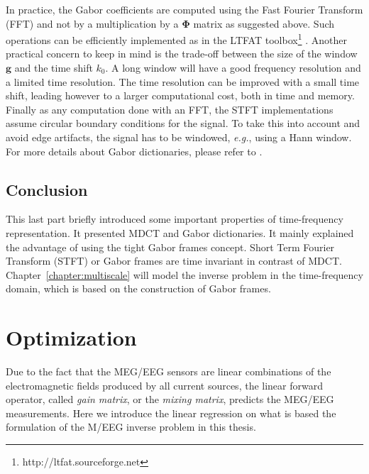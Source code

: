In practice, the Gabor coefficients are computed using the Fast Fourier Transform (FFT) and not by a multiplication by a $\mathbf{\Phi}$ matrix as suggested above. Such operations can be efficiently implemented as in the LTFAT toolbox\footnote{http://ltfat.sourceforge.net} \cite{sondergaard2012linear}. Another practical concern to keep in mind is the trade-off between the size of the window $\mathbf{g}$ and the time shift $k_0$. A long window will have a good frequency resolution and a limited time resolution. The time resolution can be improved with a small time shift, leading however to a larger computational cost, both in time and memory. Finally as any computation done with an FFT, the STFT implementations assume circular boundary conditions for the signal. To take this into account and avoid edge artifacts, the signal has to be windowed, \textit{e.g.}, using a Hann window.\\

For more details about Gabor dictionaries, please refer to \cite{daubechies1992ten}.

\subsection{Conclusion}

This last part briefly introduced some important properties of time-frequency representation. It presented MDCT and Gabor dictionaries. It mainly explained the advantage of using the tight Gabor frames concept. Short Term Fourier Transform (STFT) or Gabor frames are time invariant in contrast of MDCT. Chapter~\ref{chapter:multiscale} will model the inverse problem in the time-frequency domain, which is based on the construction of Gabor frames. 

\section{Optimization}
Due to the fact that the MEG/EEG sensors are linear combinations of the electromagnetic fields produced by all current sources, the linear forward operator, called \textit{gain matrix}, or the \textit{mixing matrix}, predicts the MEG/EEG measurements. Here we introduce the linear regression on what is based the formulation of the M/EEG inverse problem in this thesis.


